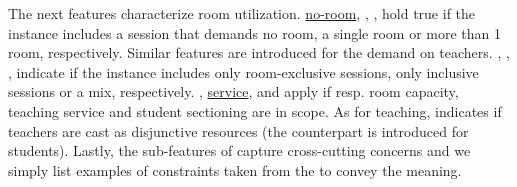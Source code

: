 The next features characterize room utilization.
\hyperref[featmodel:noroom]{no-room},
\hyperref[featmodel:singleroom]{\singleroom},
\hyperref[featmodel:multiroom]{\multiroom},
hold true if the instance includes a session that demands
no room, a single room or more than 1 room, respectively.
Similar features are introduced for the demand on teachers.
\hyperref[featmodel:allexclusive]{\allexclusive},
\hyperref[featmodel:noneexclusive]{\noneexclusive},
\hyperref[featmodel:someexclusive]{\someexclusive},
indicate if the instance includes only room-exclusive sessions, only inclusive sessions
or a mix, respectively.
\hyperref[featmodel:roomcapacity]{\roomcapacityfeat},
\hyperref[featmodel:service]{service},
and \hyperref[featmodel:sectioning]{\sectioning} apply
if resp. room capacity, teaching service and student sectioning are in scope. 
As for teaching, \hyperref[featmodel:teacheroverlap]{\teacheroverlap} indicates if teachers are cast as disjunctive resources %
(the counterpart is introduced for students).
Lastly, the sub-features of \hyperref[featmodel:aspects]{\aspects} capture
cross-cutting concerns and we simply list examples of constraints taken from the 
to convey the meaning.









